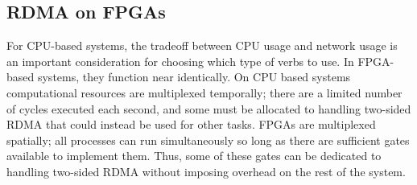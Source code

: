 \subsection{RDMA on FPGAs}

For CPU-based systems, the tradeoff between CPU usage and network usage is an important consideration for choosing which type of verbs to use. In FPGA-based systems, they function near identically. On CPU based systems computational resources are multiplexed temporally; there are a limited number of cycles executed each second, and some must be allocated to handling two-sided RDMA that could instead be used for other tasks. FPGAs are multiplexed spatially; all processes can run simultaneously so long as there are sufficient gates available to implement them. Thus, some of these gates can be dedicated to handling two-sided RDMA without imposing overhead on the rest of the system.
